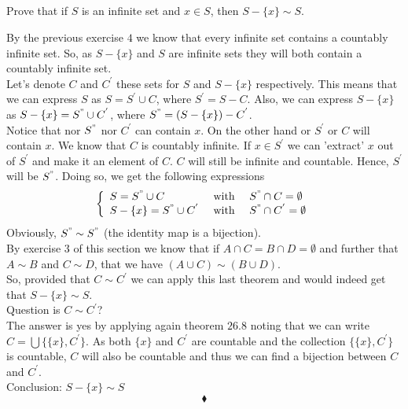 \subsection{}
\begin{tcolorbox}
Prove that if $S$ is an infinite set and $x \in S$, then $S - \{x\} \sim S$. 
\end{tcolorbox}
$$ $$
By the previous exercise $4$ we know that every infinite set contains  a countably infinite set. So, as $S - \{x\}$ and  $S$ are infinite sets they will both contain a countably infinite set. \\
Let's denote $C$ and $C^{'}$ these sets for $S$ and $S-\{x\}$ respectively. This means that we can express $S$ as $S=S^{'}\cup C$, where $S^{'}= S-C$. Also, we can express $S-\{x\}$ as $S-\{x\}=S^{"}\cup C^{'}$, where $S^{"}= (S- \{x\})-C^{'}$.\\
Notice that nor $S^{"}$ nor $C^{'}$ can contain $x$. On the other hand or $S^{'}$ or $C$ will contain $x$. We know that $C$ is countably infinite. If $x\in S^{'}$ we can 'extract' $x$ out of $S^{'}$ and make it an element of $C$. $C$ will still be infinite and countable. Hence, $S^{'}$ will be $S^{"}$. Doing so, we get the following expressions
\begin{align*}
\left\{\begin{array}{lll}
S= S^{"}\cup C&\text{ with }& S^{"}\cap C=\emptyset\\
S-\{x\}= S^{"}\cup C^{'}&\text{ with }& S^{"}\cap C^{'}=\emptyset\\
\end{array}\right.
\end{align*} 
Obviously, $S^{"}\sim S^{"}$ (the identity map is a bijection).\\
By exercise $3$ of this section we know that if $A \cap C = B\cap D=\emptyset$ and further that $A\sim  B$ and $C\sim  D$, that we have  $(A \cup C) \sim (B\cup  D)$.\\
So, provided that $C\sim C^{'}$ we can apply this last theorem and would indeed get that $S-\{x\}\sim S$.\\
Question is $C\sim C^{'}$?\\
The answer is yes by applying again theorem $\mathbf{26.8}$ noting that we can write $C=\bigcup\{\{x\}, C^{'}\}$. As both $\{x\}$ and $C^{'}$ are countable and the collection $\{\{x\}, C^{'}\}$ is countable, $C$ will also be countable and thus we can find a bijection between $C$ and $C^{'}$.\\
Conclusion: $S - \{x\} \sim S$
$$\blacklozenge$$
\newpage
